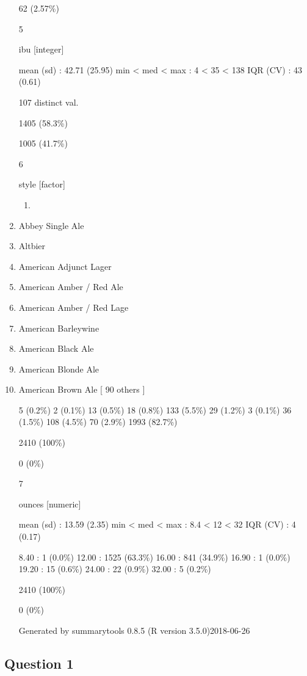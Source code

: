 \documentclass[]{article}
\begin{document}
\begin{enumerate}
  62 (2.57\%)

  5

  ibu {[}integer{]}

  mean (sd) : 42.71 (25.95) min \textless{} med \textless{} max : 4
  \textless{} 35 \textless{} 138 IQR (CV) : 43 (0.61)

  107 distinct val.

  1405 (58.3\%)

  1005 (41.7\%)

  6

  style {[}factor{]}

  \begin{enumerate}
  \def\labelenumii{\arabic{enumii}.}
  \item
  \end{enumerate}
\item
  Abbey Single Ale
\item
  Altbier
\item
  American Adjunct Lager
\item
  American Amber / Red Ale
\item
  American Amber / Red Lage
\item
  American Barleywine
\item
  American Black Ale
\item
  American Blonde Ale
\item
  American Brown Ale {[} 90 others {]}

  5 (0.2\%) 2 (0.1\%) 13 (0.5\%) 18 (0.8\%) 133 (5.5\%) 29 (1.2\%) 3
  (0.1\%) 36 (1.5\%) 108 (4.5\%) 70 (2.9\%) 1993 (82.7\%)

  2410 (100\%)

  0 (0\%)

  7

  ounces {[}numeric{]}

  mean (sd) : 13.59 (2.35) min \textless{} med \textless{} max : 8.4
  \textless{} 12 \textless{} 32 IQR (CV) : 4 (0.17)

  8.40 : 1 (0.0\%) 12.00 : 1525 (63.3\%) 16.00 : 841 (34.9\%) 16.90 : 1
  (0.0\%) 19.20 : 15 (0.6\%) 24.00 : 22 (0.9\%) 32.00 : 5 (0.2\%)

  2410 (100\%)

  0 (0\%)

  Generated by summarytools 0.8.5 (R version 3.5.0)2018-06-26
\end{enumerate}

\subsection{Question 1}\label{question-1}
\end{document}

